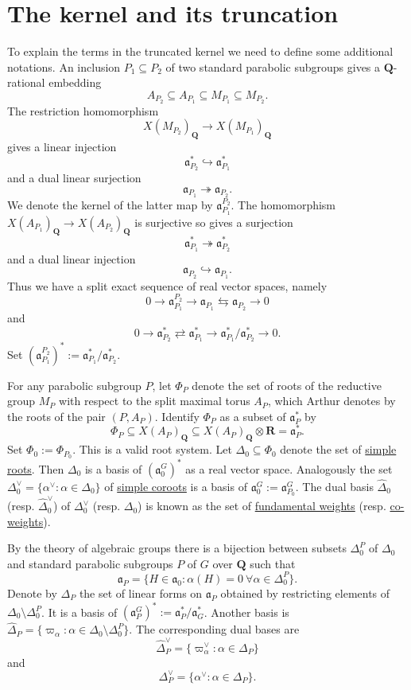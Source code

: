 \documentclass{ims9x6}
\def\Q{\mathbf Q}
\def\R{\mathbf R}
\def\aaa{\mathfrak a}
\def\bs{\setminus}
\def\se{\subseteq}
\begin{document}
\section{The kernel and its truncation}

To explain the terms in the truncated kernel we need to define some additional notations. An inclusion $P_1 \se P_2$ of two standard parabolic subgroups gives a $\Q$-rational embedding
\[ A_{P_2} \se A_{P_1} \se M_{P_1} \se M_{P_2}. \]
The restriction homomorphism 
\[ X(M_{P_2})_{\Q} \to X(M_{P_1})_{\Q} \]
gives a linear injection
\[ \aaa_{P_2}^* \hookrightarrow \aaa_{P_1}^* \]
and a dual linear surjection
\[ \aaa_{P_1} \twoheadrightarrow \aaa_{P_2}. \]
We denote the kernel of the latter map by $\aaa_{P_1}^{P_2}$. The homomorphism $X(A_{P_1})_{\Q} \to X(A_{P_2})_{\Q}$ is surjective so gives a surjection
\[ \aaa_{P_1}^* \twoheadrightarrow \aaa_{P_2}^* \]
and a dual linear injection
\[ \aaa_{P_2} \hookrightarrow \aaa_{P_1}. \]
Thus we have a split exact sequence of real vector spaces, namely
\[ 0 \to \aaa_{P_1}^{P_2} \to \aaa_{P_1} \leftrightarrows \aaa_{P_2} \to 0\]
and 
\[ 0 \to \aaa_{P_2}^* \rightleftarrows \aaa_{P_1}^* \to \aaa_{P_1}^* / \aaa_{P_2}^* \to 0. \]
Set $(\aaa_{P_1}^{P_2})^* := \aaa_{P_1}^* / \aaa_{P_2}^*$. 

For any parabolic subgroup $P$, let $\Phi_P$ denote the set of roots of the reductive group $M_P$ with respect to the split maximal torus $A_P$, which Arthur denotes by the roots of the pair $(P, A_P)$. Identify $\Phi_P$ as a subset of $\aaa_P^*$ by 
\[ \Phi_P \se X(A_P)_\Q \se X(A_P)_\Q \otimes \R = \aaa_P^*. \]
Set $\Phi_0 := \Phi_{P_0}$. This is a valid root system. Let $\Delta_0 \se \Phi_0$ denote the set of \underline{simple roots}. Then $\Delta_0$ is a basis of $(\aaa_0^G)^*$ as a real vector space. Analogously the set $\Delta_0^\vee = \{ \alpha^\vee : \alpha \in \Delta_0\}$ of \underline{simple coroots} is a basis of $\aaa_0^G:= \aaa_{P_0}^G$. The dual basis $\hat\Delta_0$ (resp. $\hat \Delta_0^\vee$) of $\Delta_0^\vee$ (resp. $\Delta_0$) is known as the set of \underline{fundamental weights} (resp. \underline{co-weights}). 

By the theory of algebraic groups there is a bijection between subsets $\Delta_0^P$ of $\Delta_0$ and standard parabolic subgroups $P$ of $G$ over $\Q$ such that 
\[ \aaa_P = \{ H \in \aaa_0 : \alpha(H) = 0 \ \forall \alpha \in \Delta_0^P \}. \]
Denote by $\Delta_P$ the set of linear forms on $\aaa_P$ obtained by restricting elements of $\Delta_0 \bs \Delta_0^P$. It is a basis of $(\aaa_P^G)^* := \aaa_P^* / \aaa_G^*$. Another basis is $\hat\Delta_P = \{ \varpi_\alpha : \alpha \in \Delta_0 \bs \Delta_0^P \}.$ The corresponding dual bases are 
\[ \hat\Delta_P^\vee = \{\varpi_\alpha^\vee : \alpha \in \Delta_P \} \]
and
\[ \Delta_P^\vee = \{ \alpha^\vee : \alpha \in \Delta_P \}. \]
\end{document}
